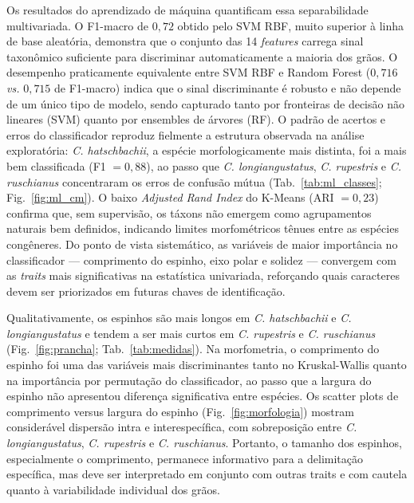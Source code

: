 \documentclass[pdflatex,sn-mathphys-num]{sn-jnl}
\begin{document}
Os resultados do aprendizado de máquina quantificam essa separabilidade multivariada. O F1-macro de $0{,}72$ obtido pelo SVM RBF, muito superior à linha de base aleatória, demonstra que o conjunto das 14 \textit{features} carrega sinal taxonômico suficiente para discriminar automaticamente a maioria dos grãos. O desempenho praticamente equivalente entre SVM RBF e Random Forest ($0{,}716$ \textit{vs.} $0{,}715$ de F1-macro) indica que o sinal discriminante é robusto e não depende de um único tipo de modelo, sendo capturado tanto por fronteiras de decisão não lineares (SVM) quanto por ensembles de árvores (RF). O padrão de acertos e erros do classificador reproduz fielmente a estrutura observada na análise exploratória: \textit{C. hatschbachii}, a espécie morfologicamente mais distinta, foi a mais bem classificada (F1 $= 0{,}88$), ao passo que \textit{C. longiangustatus}, \textit{C. rupestris} e \textit{C. ruschianus} concentraram os erros de confusão mútua (Tab.~\ref{tab:ml_classes}; Fig.~\ref{fig:ml_cm}). O baixo \textit{Adjusted Rand Index} do K-Means (ARI $= 0{,}23$) confirma que, sem supervisão, os táxons não emergem como agrupamentos naturais bem definidos, indicando limites morfométricos tênues entre as espécies congêneres. Do ponto de vista sistemático, as variáveis de maior importância no classificador --- comprimento do espinho, eixo polar e solidez --- convergem com as \textit{traits} mais significativas na estatística univariada, reforçando quais caracteres devem ser priorizados em futuras chaves de identificação.

Qualitativamente, os espinhos são mais longos em \textit{C. hatschbachii} e \textit{C. longiangustatus} e tendem a ser mais curtos em \textit{C. rupestris} e \textit{C. ruschianus} (Fig.~\ref{fig:prancha}; Tab.~\ref{tab:medidas}). Na morfometria, o comprimento do espinho foi uma das variáveis mais discriminantes tanto no Kruskal-Wallis quanto na importância por permutação do classificador, ao passo que a largura do espinho não apresentou diferença significativa entre espécies. Os scatter plots de comprimento versus largura do espinho (Fig.~\ref{fig:morfologia}) mostram considerável dispersão intra e interespecífica, com sobreposição entre \textit{C. longiangustatus}, \textit{C. rupestris} e \textit{C. ruschianus}. Portanto, o tamanho dos espinhos, especialmente o comprimento, permanece informativo para a delimitação específica, mas deve ser interpretado em conjunto com outras traits e com cautela quanto à variabilidade individual dos grãos.
\end{document}
